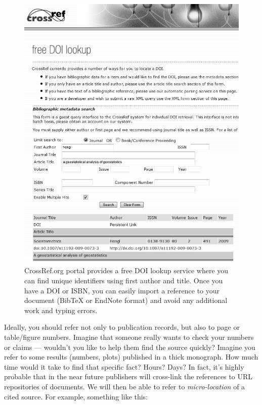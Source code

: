 \documentclass[graybox,envcountchap,sectrefs,UStrade]{svmono}
\begin{document}
\begin{figure}[!htb]
\begin{center}
  \includegraphics[width=\textwidth]{Fig_crossref_search_screen.jpg}
\caption{CrossRef.org portal provides a free DOI lookup service where you can find unique identifiers using first author and title. Once you have a DOI or ISBN, you can easily import a reference to your document (BibTeX or EndNote format) and avoid any additional work and typing errors.} \label{Fig:crossref_search_screen}
\end{center}
\end{figure}

Ideally, you should refer not only to publication records, but also to page or table/figure numbers. Imagine that someone really wants to check your numbers or claims --- wouldn't you like to help them find the source quickly? Imagine you refer to some results (numbers, plots) published in a thick monograph. How much time would it take to find that specific fact? Hours? Days? In fact, it's highly probable that in the near future publishers will cross-link the references to URL repositories of documents. We will then be able to refer to \emph{micro-location} of a cited source. For example, something like this:
\end{document}
